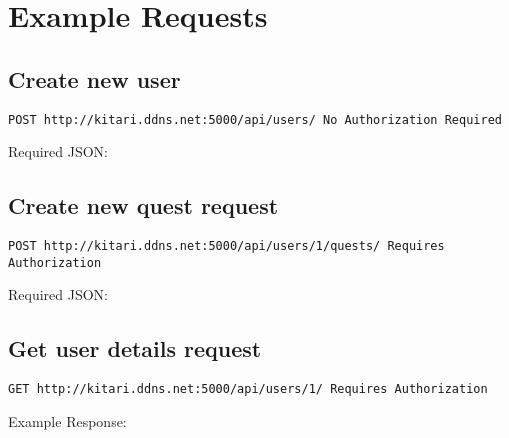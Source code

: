 \chapter{Example Requests}
\label{appendix:requests}
\section{Create new user}
\texttt{POST http://kitari.ddns.net:5000/api/users/ No Authorization Required}

Required JSON:


\section{Create new quest request}
\texttt{POST http://kitari.ddns.net:5000/api/users/1/quests/ Requires Authorization}

Required JSON:



\section{Get user details request}
\texttt{GET http://kitari.ddns.net:5000/api/users/1/ Requires Authorization}

Example Response:
